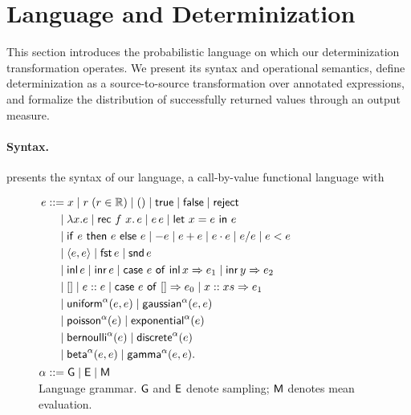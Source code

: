 \section{Language and Determinization}
\label{sec:language}

This section introduces the probabilistic language on which our determinization transformation operates. We present its syntax and operational semantics, define determinization as a source-to-source transformation over annotated expressions, and formalize the distribution of successfully returned values through an output measure.

\paragraph{Syntax.}
 presents the syntax of our language, a call-by-value functional language with 

\begin{figure}
\vspace{-1em}
\centering\small
$\begin{aligned}
  e &::= x\mid r\;(r\in\mathbb{R})\mid ()\mid\mathsf{true}\mid\mathsf{false}\mid\mathsf{reject}\\
   &\quad\mid \lambda x.e\mid\mathsf{rec}\ f\ x.\,e\mid e\,e
       \mid\mathsf{let}\ x=e\ \mathsf{in}\ e\\
   &\quad\mid \mathsf{if}\ e\ \mathsf{then}\ e\ \mathsf{else}\ e\mid -e\mid e+e\mid e\cdot e\mid e/e\mid e<e\\
   &\quad\mid \langle e,e\rangle\mid\mathsf{fst}\,e\mid\mathsf{snd}\,e\\
   &\quad\mid \mathsf{inl}\,e\mid\mathsf{inr}\,e\mid\mathsf{case}\ e\ \mathsf{of}\ \mathsf{inl}\,x\Rightarrow e_1\mid\mathsf{inr}\,y\Rightarrow e_2\\
   &\quad\mid []\mid e::e\mid\mathsf{case}\ e\ \mathsf{of}\ []\Rightarrow e_0\mid x::xs\Rightarrow e_1\\
   &\quad\mid \mathsf{uniform}^{\alpha}(e,e)\mid\mathsf{gaussian}^{\alpha}(e,e)\\
   &\quad\mid \mathsf{poisson}^{\alpha}(e)\mid\mathsf{exponential}^{\alpha}(e)\\
   &\quad\mid \mathsf{bernoulli}^{\alpha}(e)\mid\mathsf{discrete}^{\alpha}(e)\\
   &\quad\mid \mathsf{beta}^{\alpha}(e,e)\mid\mathsf{gamma}^{\alpha}(e,e).\\[1pt]
  \alpha &::= \mathsf{G}\mid\mathsf{E}\mid\mathsf{M}\\[-1em]
\end{aligned}$
\caption{\footnotesize Language grammar. $\mathsf{G}$ and $\mathsf{E}$ denote sampling; $\mathsf{M}$ denotes mean evaluation.}
\label{fig:syntax}
\vspace{-2em}
\end{figure}

